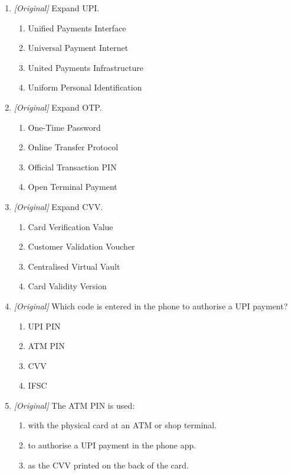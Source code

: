 \begin{enumerate}[label=\textbf{Q\arabic*.}, leftmargin=*]
\item \textit{[Original]} Expand UPI.
  \begin{enumerate}[label=\Alph*.]
    \item Unified Payments Interface
    \item Universal Payment Internet
    \item United Payments Infrastructure
    \item Uniform Personal Identification
  \end{enumerate}
\item \textit{[Original]} Expand OTP.
  \begin{enumerate}[label=\Alph*.]
    \item One-Time Password
    \item Online Transfer Protocol
    \item Official Transaction PIN
    \item Open Terminal Payment
  \end{enumerate}
\item \textit{[Original]} Expand CVV.
  \begin{enumerate}[label=\Alph*.]
    \item Card Verification Value
    \item Customer Validation Voucher
    \item Centralised Virtual Vault
    \item Card Validity Version
  \end{enumerate}
\item \textit{[Original]} Which code is entered in the phone to authorise a
  UPI payment?
  \begin{enumerate}[label=\Alph*.]
    \item UPI PIN
    \item ATM PIN
    \item CVV
    \item IFSC
  \end{enumerate}
\item \textit{[Original]} The ATM PIN is used:
  \begin{enumerate}[label=\Alph*.]
    \item with the physical card at an ATM or shop terminal.
    \item to authorise a UPI payment in the phone app.
    \item as the CVV printed on the back of the card.

\end{enumerate}
\end{enumerate}
